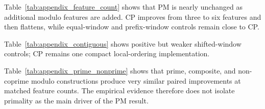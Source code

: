 ﻿\documentclass[11pt,a4paper]{article}
\begin{document}
\clearpage

{\renewcommand{\thetable}{D1}
\begin{center}
\label{tab:appendix_feature_count}
\scriptsize
\renewcommand{\arraystretch}{1.08}
\resizebox{0.86\textwidth}{!}{}
\end{center}}

\noindent
Table~\ref{tab:appendix_feature_count} shows that PM is nearly unchanged as additional modulo features are added. CP improves from three to six features and then flattens, while equal-window and prefix-window controls remain close to CP.

{\renewcommand{\thetable}{D2}
\begin{center}
\label{tab:appendix_contiguous}
\scriptsize
\renewcommand{\arraystretch}{1.08}
\resizebox{0.90\textwidth}{!}{}
\end{center}}

\noindent
Table~\ref{tab:appendix_contiguous} shows positive but weaker shifted-window controls; CP remains one compact local-ordering implementation.

{\renewcommand{\thetable}{D3}
\begin{center}
\label{tab:appendix_prime_nonprime}
\scriptsize
\renewcommand{\arraystretch}{1.08}
\resizebox{0.84\textwidth}{!}{}
\end{center}}

\noindent
Table~\ref{tab:appendix_prime_nonprime} shows that prime, composite, and non-coprime modulo constructions produce very similar paired improvements at matched feature counts. The empirical evidence therefore does not isolate primality as the main driver of the PM result.

\clearpage

{\renewcommand{\thetable}{D4}
\begin{center}
\label{tab:appendix_random}
\scriptsize
\renewcommand{\arraystretch}{1.08}
\resizebox{0.88\textwidth}{!}{}
\end{center}}
\end{document}
